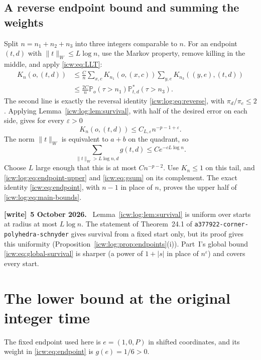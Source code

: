 \documentclass[11pt,letterpaper]{article}
\theoremstyle{remark}\newtheorem{remark}[theorem]{Remark}
\newcommand{\eps}{\varepsilon}
\newcommand{\Prob}{\mathbb P}
\newcommand{\1}{\mathbf1}
\newenvironment{writenote}[1][]{\par\smallskip\begingroup\small
 \noindent\textbf{[write]}\if\relax\detokenize{#1}\relax\else~\textbf{#1.}\fi\ }%
 {\par\endgroup\smallskip}
\newcommand{\file}[1]{\textup{\nolinkurl{#1}}}
\begin{document}
\subsection{A reverse endpoint bound and summing the weights}
Split $n=n_1+n_2+n_3$ into three integers comparable to $n$. For an
endpoint $(t,d)$ with $\|t\|_W\le L\log n$, use the Markov property,
remove killing in the middle, and apply \eqref{icw:eq:LLT}:
\begin{align*}
 K_n(o,(t,d))
 &\le\frac Cn\sum_{x,c}K_{n_1}(o,(x,c))
                   \sum_{y,e}K_{n_3}((y,e),(t,d))\\
 &\le\frac{2C}n\Prob_o(\tau>n_1)
                      \Prob^*_{t,d}(\tau>n_3).
\end{align*}
The second line is exactly the reversal identity
\eqref{icw:log:eq:reverse}, with $\pi_d/\pi_e\le2$. Applying
Lemma~\ref{icw:log:lem:survival}, with half of the desired error on each side,
gives for every $\eps>0$
\begin{equation}\label{icw:log:eq:endpoint-upper}
 K_n(o,(t,d))\le C_{L,\eps}n^{-p-1+\eps}.
\end{equation}
The norm $\|t\|_W$ is equivalent to $a+b$ on the quadrant, so
\[
 \sum_{\|t\|_W>L\log n,d}g(t,d)\le C e^{-cL\log n}.
\]
Choose $L$ large enough that this is at most $Cn^{-p-2}$.
Use $K_n\le1$ on this tail, and \eqref{icw:log:eq:endpoint-upper} and
\eqref{icw:eq:gsum} on its complement. The exact identity
\eqref{icw:eq:endpoint}, with $n-1$ in place of $n$, proves the upper half
of \eqref{icw:log:eq:main-bounds}.
\begin{writenote}[5 October 2026]
Lemma~\ref{icw:log:lem:survival} is uniform over starts at radius at most $L\log n$. The statement of Theorem~24.1 of \file{a377922-corner-polyhedra-schnyder} gives survival from a fixed start only, but its proof gives this uniformity (Proposition~\ref{icw:log:prop:endpoints}(i)). Part~I's global bound \eqref{icw:eq:global-survival} is sharper (a power of $1+|s|$ in place of $n^{\eps}$) and covers every start.
\end{writenote}

\section{The lower bound at the original integer time}\label{icw:log:sec:lower}
The fixed endpoint used here is $e=(1,0,P)$ in shifted coordinates,
and its weight in \eqref{icw:eq:endpoint} is $g(e)=1/6>0$.
\end{document}
